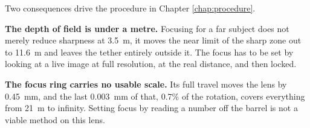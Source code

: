 Two consequences drive the procedure in Chapter \ref{chap:procedure}.

\textbf{The depth of field is under a metre.} Focusing for a far subject does
not merely reduce sharpness at 3.5~m, it moves the near limit of the sharp
zone out to 11.6~m and leaves the tether entirely outside it. The focus has to
be set by looking at a live image at full resolution, at the real distance,
and then locked.

\textbf{The focus ring carries no usable scale.} Its full travel moves the
lens by 0.45~mm, and the last 0.003~mm of that, 0.7\% of the rotation, covers
everything from 21~m to infinity. Setting focus by reading a number off the
barrel is not a viable method on this lens.
